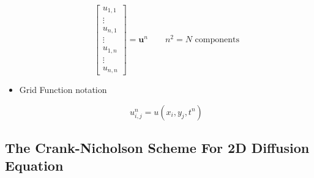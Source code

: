\begin{itemize}
    \begin{equation}
        \begin{bmatrix}
            u_{1,1} \\
            \vdots \\
            u_{n,1} \\
            \vdots \\
            u_{1,n} \\
            \vdots \\
            u_{n,n}
        \end{bmatrix} = \mathbf{u}^n \qquad n^2 = N \text{ components}
    \end{equation}
    \item Grid Function notation

    \[ u_{i,j}^n = u(x_i, y_j, t^n)\]
\end{itemize}

\subsection{The Crank-Nicholson Scheme For 2D Diffusion Equation}

